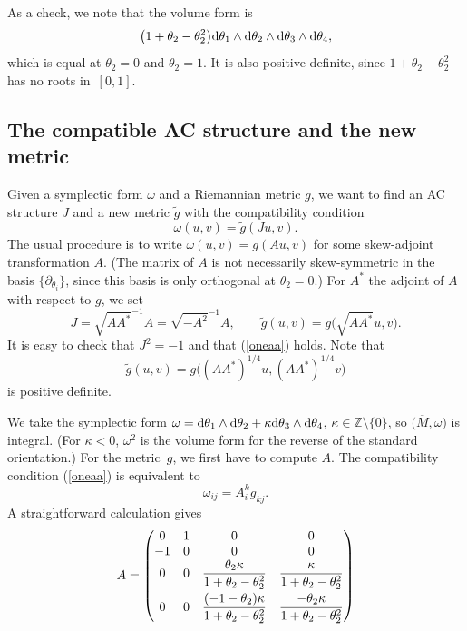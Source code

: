 \documentclass[pdftex]{sigma}
\numberwithin{equation}{section}
\theoremstyle{definition}
\newcommand{\BbZ}{{\mathbb Z}}
\newcommand{\Z}{\BbZ}
\newcommand{\om}{\overline{M}}
\newcommand{\tg}{\tilde g}
\begin{document}
As a check, we note that the volume form is
\[ \bigl(1+\theta_2-\theta_2^2\bigr){\rm d}\theta_1\wedge {\rm d}\theta_2 \wedge {\rm d}\theta_3\wedge {\rm d}\theta_4,\]
which is equal at $\theta_2=0$ and $\theta_2 = 1$. It is also positive definite, since $1+\theta_2-\theta_2^2$ has no roots in~$[0,1]$.

\subsection{The compatible AC structure and the new metric}%

Given a symplectic form $\omega$ and a Riemannian metric $g$, we want to find an AC structure $J$ and a new metric $\tg$ with the compatibility condition
\begin{equation}\label{oneaa}\omega(u,v) = \tg(Ju,v).
\end{equation}
 The usual procedure is to write
$\omega(u,v) = g(Au, v)$
for some skew-adjoint transformation $A$. (The matrix of $A$ is not necessarily skew-symmetric in the
basis $\{\partial_{\theta_i}\}$, since this basis is only orthogonal at $\theta_2=0$.)
For $A^*$
the adjoint of $A$ with respect to $g$, we set
\begin{equation*}%
J = \sqrt{AA^*}^{-1}A = \sqrt{-A^2}^{-1}A,\qquad \tg(u,v) = g\bigl(\sqrt{AA^*}u,v\bigr).
\end{equation*}
It is easy to check that $J^2 = -1$ and that (\ref{oneaa}) holds. Note that
\[
\tg(u,v) = g\bigl((AA^*)^{1/4}u,(AA^*)^{1/4}v\bigr)
\]
is positive definite.

We take the symplectic form $\omega = {\rm d}\theta_1\wedge {\rm d}\theta_2 + \kappa {\rm d}\theta_3\wedge {\rm d}\theta_4$, $\kappa\in \Z\setminus \{0\}$, so $\bigl(\om,\omega\bigr)$ is integral. \big(For $\kappa <0$, $\omega^2$ is the volume form for the reverse of the standard orientation.\big) For the metric~$g$, we first have to compute $A$. The compatibility condition (\ref{oneaa}) is equivalent to
\begin{equation*}%
\omega_{ij} = A^k_i g_{kj}.
\end{equation*}
A straightforward calculation gives
\[A = \begin{pmatrix} 0&1&0&0\\
-1&0&0&0\\
0&0& \dfrac{\theta_2\kappa}{1+\theta_2-\theta_2^2}& \dfrac{\kappa}{1+\theta_2-\theta_2^2}\vspace{1mm}\\
0&0&\dfrac{(-1-\theta_2)\kappa}{1+\theta_2-\theta_2^2}& \dfrac{-\theta_2\kappa}{1+\theta_2-\theta_2^2}
\end{pmatrix}\]
\end{document}

